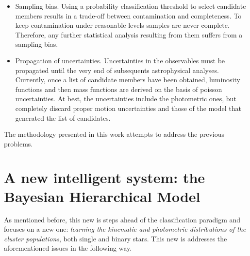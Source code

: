 \begin{itemize}
\item Sampling bias. Using a probability classification threshold to select candidate members results in a trade-off between contamination and completeness. To keep contamination under reasonable levels samples are never complete. Therefore, any further statistical analysis resulting from them suffers from a sampling bias.
\item Propagation of uncertainties. Uncertainties in the observables must be propagated until the very end of subsequents astrophysical analyses. Currently, once a list of candidate members have been obtained, luminosity functions and then mass functions are derived on the basis of poisson uncertainties. At best, the uncertainties include the photometric ones, but completely discard proper motion uncertainties and those of the model that generated the list of candidates.
\end{itemize}

The methodology presented in this work attempts to address the previous problems.

\section{A new intelligent system: the Bayesian Hierarchical Model}
\label{sect:newIS}

As mentioned before, this new \gls{is} steps ahead of the classification paradigm and focuses on a new one: \textit{learning the kinematic and photometric distributions of the cluster populations}, both single and binary stars. This new \gls{is} addresses the aforementioned issues in the following way.

